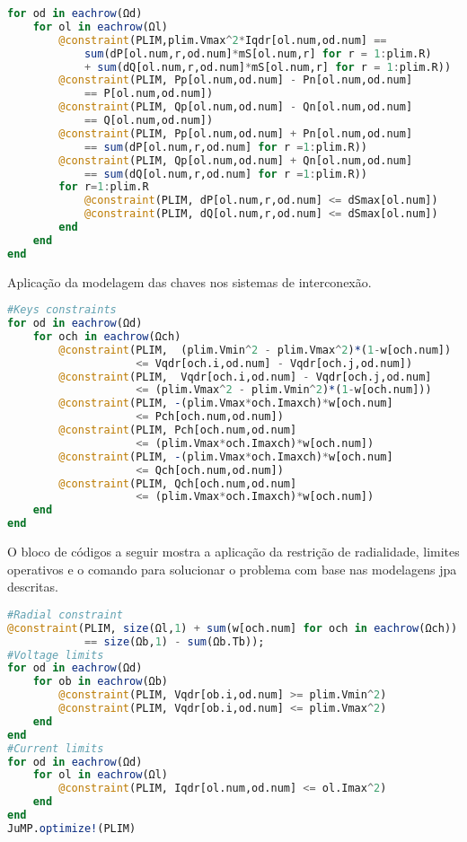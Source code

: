 \begin{lstlisting}[language = Julia, firstnumber = 84]
for od in eachrow(Ωd)    
    for ol in eachrow(Ωl)
        @constraint(PLIM,plim.Vmax^2*Iqdr[ol.num,od.num] == 
            sum(dP[ol.num,r,od.num]*mS[ol.num,r] for r = 1:plim.R) 
            + sum(dQ[ol.num,r,od.num]*mS[ol.num,r] for r = 1:plim.R)) 
        @constraint(PLIM, Pp[ol.num,od.num] - Pn[ol.num,od.num] 
            == P[ol.num,od.num])
        @constraint(PLIM, Qp[ol.num,od.num] - Qn[ol.num,od.num] 
            == Q[ol.num,od.num])
        @constraint(PLIM, Pp[ol.num,od.num] + Pn[ol.num,od.num] 
            == sum(dP[ol.num,r,od.num] for r =1:plim.R))
        @constraint(PLIM, Qp[ol.num,od.num] + Qn[ol.num,od.num] 
            == sum(dQ[ol.num,r,od.num] for r =1:plim.R))
        for r=1:plim.R
            @constraint(PLIM, dP[ol.num,r,od.num] <= dSmax[ol.num])
            @constraint(PLIM, dQ[ol.num,r,od.num] <= dSmax[ol.num])
        end
    end
end
\end{lstlisting}

Aplicação da modelagem das chaves nos sistemas de interconexão.

\begin{lstlisting}[language = Julia, firstnumber = 103]
#Keys constraints
for od in eachrow(Ωd)    
    for och in eachrow(Ωch)
        @constraint(PLIM,  (plim.Vmin^2 - plim.Vmax^2)*(1-w[och.num]) 
                    <= Vqdr[och.i,od.num] - Vqdr[och.j,od.num])
        @constraint(PLIM,  Vqdr[och.i,od.num] - Vqdr[och.j,od.num] 
                    <= (plim.Vmax^2 - plim.Vmin^2)*(1-w[och.num]))
        @constraint(PLIM, -(plim.Vmax*och.Imaxch)*w[och.num] 
                    <= Pch[och.num,od.num])
        @constraint(PLIM, Pch[och.num,od.num] 
                    <= (plim.Vmax*och.Imaxch)*w[och.num])
        @constraint(PLIM, -(plim.Vmax*och.Imaxch)*w[och.num] 
                    <= Qch[och.num,od.num])
        @constraint(PLIM, Qch[och.num,od.num] 
                    <= (plim.Vmax*och.Imaxch)*w[och.num])
    end
end
\end{lstlisting}

O bloco de códigos a seguir mostra a aplicação da restrição de radialidade, limites operativos e o comando para solucionar o problema com base nas modelagens jpa descritas.

\begin{lstlisting}[language = Julia, firstnumber = 120]
#Radial constraint
@constraint(PLIM, size(Ωl,1) + sum(w[och.num] for och in eachrow(Ωch)) 
            == size(Ωb,1) - sum(Ωb.Tb));
#Voltage limits
for od in eachrow(Ωd)
    for ob in eachrow(Ωb)
        @constraint(PLIM, Vqdr[ob.i,od.num] >= plim.Vmin^2)
        @constraint(PLIM, Vqdr[ob.i,od.num] <= plim.Vmax^2)
    end
end
#Current limits
for od in eachrow(Ωd)
    for ol in eachrow(Ωl)
        @constraint(PLIM, Iqdr[ol.num,od.num] <= ol.Imax^2)
    end
end
JuMP.optimize!(PLIM)
\end{lstlisting}

